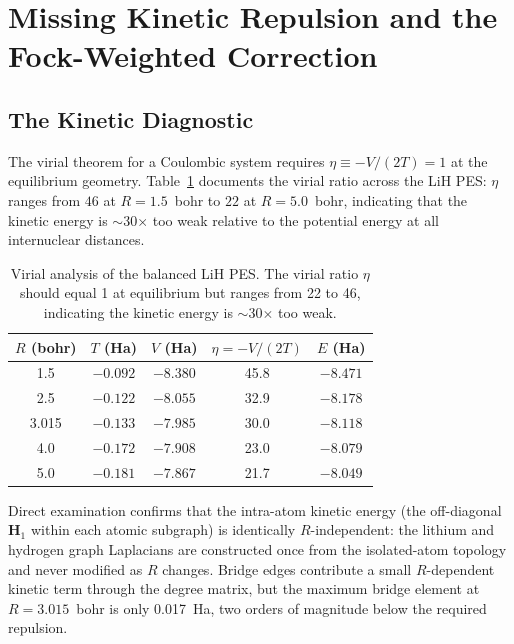 \documentclass[aps,pra,twocolumn,superscriptaddress,longbibliography]{revtex4-2}
\begin{document}
\section{Missing Kinetic Repulsion and the Fock-Weighted Correction}
\label{sec:kinetic}

\subsection{The Kinetic Diagnostic}
\label{sec:kinetic_diagnostic}

The virial theorem for a Coulombic system requires
$\eta \equiv -V/(2T) = 1$ at the equilibrium geometry.
Table~\ref{tab:virial} documents the virial ratio across the LiH PES:
$\eta$ ranges from $46$ at $R=1.5$~bohr to $22$ at $R=5.0$~bohr,
indicating that the kinetic energy is $\sim$30$\times$ too weak relative
to the potential energy at all internuclear distances.

\begin{table}[h]
\centering
\begin{tabular}{ccccc}
\toprule
$R$ (bohr) & $T$ (Ha) & $V$ (Ha) & $\eta=-V/(2T)$ & $E$ (Ha) \\
\midrule
1.5 & $-0.092$ & $-8.380$ & 45.8 & $-8.471$ \\
2.5 & $-0.122$ & $-8.055$ & 32.9 & $-8.178$ \\
3.015 & $-0.133$ & $-7.985$ & 30.0 & $-8.118$ \\
4.0 & $-0.172$ & $-7.908$ & 23.0 & $-8.079$ \\
5.0 & $-0.181$ & $-7.867$ & 21.7 & $-8.049$ \\
\bottomrule
\end{tabular}
\caption{Virial analysis of the balanced LiH PES.  The virial ratio
$\eta$ should equal 1 at equilibrium but ranges from 22 to 46,
indicating the kinetic energy is $\sim$30$\times$ too weak.}
\label{tab:virial}
\end{table}

Direct examination confirms that the intra-atom kinetic energy (the
off-diagonal $\mathbf{H}_1$ within each atomic subgraph) is identically
$R$-independent: the lithium and hydrogen graph Laplacians are
constructed once from the isolated-atom topology and never modified as
$R$ changes.  Bridge edges contribute a small $R$-dependent kinetic
term through the degree matrix, but the maximum bridge element at
$R=3.015$~bohr is only 0.017~Ha, two orders of magnitude below the
required repulsion.
\end{document}
